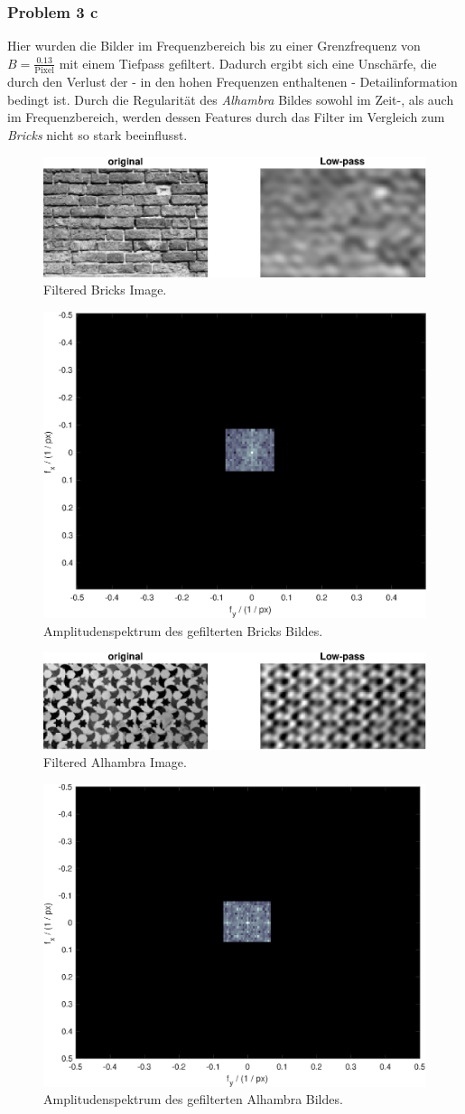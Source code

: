 \subsubsection{Problem 3 c}
Hier wurden die Bilder im Frequenzbereich bis zu einer Grenzfrequenz von $B = \frac{0.13}{\mathrm{Pixel}}$ mit einem Tiefpass gefiltert. Dadurch ergibt sich eine Unschärfe, die durch den Verlust der - in den hohen Frequenzen enthaltenen - Detailinformation bedingt ist. Durch die Regularität des \textit{Alhambra} Bildes sowohl im Zeit-, als auch im Frequenzbereich, werden dessen Features durch das Filter im Vergleich zum \textit{Bricks} nicht so stark beeinflusst.
\begin{figure}[!h]
    \centering
    \includegraphics[width=\textwidth]{ue5/bricks_lp.eps}
    \caption{Filtered Bricks Image.}
    \label{fig:bricks_lp}
\end{figure}

\begin{figure}[h]
    \captionsetup{width=0.8\columnwidth}
    \centering
    \includegraphics[width=.4\columnwidth]{ue5/bricks_spec_fil.eps}
    \caption{Amplitudenspektrum des gefilterten Bricks Bildes.}
    \label{fig:bricks_lp_fil}
\end{figure}

\begin{figure}[!h]
\centering
    \includegraphics[width=\textwidth]{ue5/alhambra_lp.eps}
    \caption{Filtered Alhambra Image.}
    \label{fig:alhambra_lp}
\end{figure}

\begin{figure}[h]
    \captionsetup{width=0.8\columnwidth}
    \centering
    \includegraphics[width=.4\columnwidth]{ue5/alhambra_spec_fil.eps}
    \caption{Amplitudenspektrum des gefilterten Alhambra Bildes.}
    \label{fig:alhambra_lp_fil}
\end{figure}
